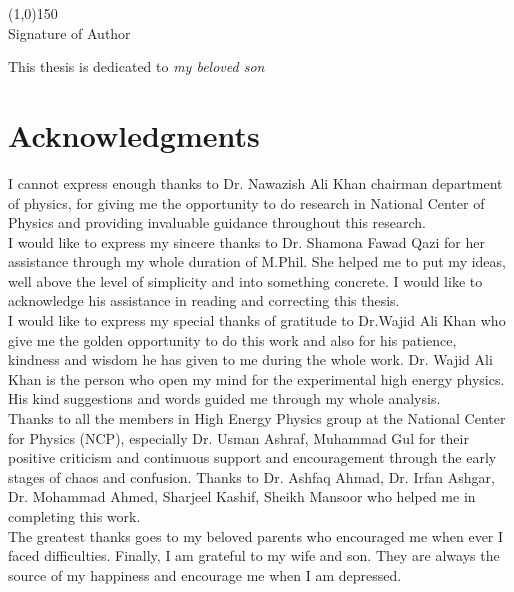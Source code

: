 \documentclass[a4paper,12pt]{report}
\numberwithin{equation}{section}
\begin{document}
     \begin{flushright}
     \line(1,0){150} \\
     Signature of Author
    \end{flushright}        

    
    \newpage
    \vspace*{8cm}
    \begin{center}
        \Large This thesis is dedicated to \emph{my beloved son}
    \end{center}

   

    \newpage
    \chapter*{Acknowledgments}
    I cannot express enough thanks to Dr. Nawazish Ali Khan chairman department of physics, for giving me the opportunity to do research in National Center of Physics and providing invaluable guidance throughout this research.\\
        I would like to express my sincere thanks to Dr. Shamona Fawad Qazi for her assistance through my whole duration of M.Phil. She helped me to put my ideas, well above the level of simplicity and into something concrete. I would like to acknowledge his assistance in reading and correcting this thesis.\\  
    I would like to express my special thanks of gratitude to Dr.Wajid Ali Khan who give me the golden opportunity to do this work and also for his patience, kindness and wisdom he has given to me during the whole work. Dr. Wajid Ali Khan is the person who open my mind for the experimental high energy physics. His kind suggestions and words guided me through my whole analysis.\\
   Thanks to all the members in High Energy Physics group at the National
Center for Physics (NCP), especially Dr. Usman Ashraf, Muhammad Gul for their positive criticism and continuous support and encouragement through the early stages of chaos and confusion. Thanks to Dr. Ashfaq Ahmad, Dr. Irfan Ashgar, Dr. Mohammad Ahmed, Sharjeel Kashif, Sheikh Mansoor who helped me in completing this work.\\
The greatest thanks goes to my beloved parents who encouraged me when ever I faced difficulties. Finally, I am grateful to my wife and son. They are always the source of my happiness and encourage me when I am depressed. \\[2cm]
\end{document}
